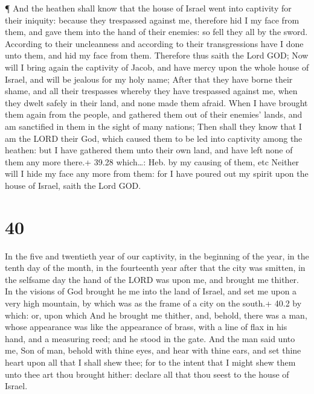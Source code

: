  ¶ And the heathen shall know that the house of Israel went
into captivity for their iniquity: because they trespassed against me,
therefore hid I my face from them, and gave them into the hand of their
enemies: so fell they all by the sword.  According to their
uncleanness and according to their transgressions have I done unto them,
and hid my face from them.  Therefore thus saith the Lord
GOD; Now will I bring again the captivity of Jacob, and have mercy upon
the whole house of Israel, and will be jealous for my holy name;
 After that they have borne their shame, and all their
trespasses whereby they have trespassed against me, when they dwelt
safely in their land, and none made them afraid.  When I
have brought them again from the people, and gathered them out of their
enemies' lands, and am sanctified in them in the sight of many nations;
 Then shall they know that I am the LORD their God, which
caused them to be led into captivity among the heathen: but I have
gathered them unto their own land, and have left none of them any more
there.+ 39.28 which\ldots: Heb. by my causing of them, etc 
Neither will I hide my face any more from them: for I have poured out my
spirit upon the house of Israel, saith the Lord GOD.

\hypertarget{section-39}{%
\section{40}\label{section-39}}

 In the five and twentieth year of our captivity, in the
beginning of the year, in the tenth day of the month, in the fourteenth
year after that the city was smitten, in the selfsame day the hand of
the LORD was upon me, and brought me thither.  In the
visions of God brought he me into the land of Israel, and set me upon a
very high mountain, by which was as the frame of a city on the south.+
40.2 by which: or, upon which  And he brought me thither,
and, behold, there was a man, whose appearance was like the appearance
of brass, with a line of flax in his hand, and a measuring reed; and he
stood in the gate.  And the man said unto me, Son of man,
behold with thine eyes, and hear with thine ears, and set thine heart
upon all that I shall shew thee; for to the intent that I might shew
them unto thee art thou brought hither: declare all that thou seest to
the house of Israel.

